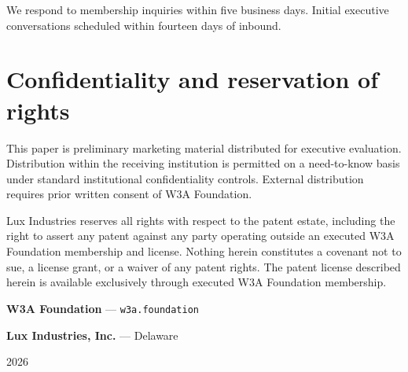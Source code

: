 \documentclass[11pt,letterpaper]{article}
\begin{document}
We respond to membership inquiries within five business days. Initial executive conversations scheduled within fourteen days of inbound.

\section*{Confidentiality and reservation of rights}

This paper is preliminary marketing material distributed for executive evaluation. Distribution within the receiving institution is permitted on a need-to-know basis under standard institutional confidentiality controls. External distribution requires prior written consent of W3A Foundation.

Lux Industries reserves all rights with respect to the patent estate, including the right to assert any patent against any party operating outside an executed W3A Foundation membership and license. Nothing herein constitutes a covenant not to sue, a license grant, or a waiver of any patent rights. The patent license described herein is available exclusively through executed W3A Foundation membership.

\bigskip
\centerline{\textbf{W3A Foundation} --- \texttt{w3a.foundation}}
\centerline{\textbf{Lux Industries, Inc.} --- Delaware}
\centerline{2026}
\end{document}
